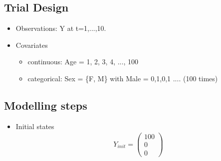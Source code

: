 \subsection*{Trial Design}

\begin{itemize}
\item
Observations: Y at t=1,...,10.
\item
Covariates
\begin{itemize}
\item
continuous: Age = 1, 2, 3, 4, ..., 100

\item
categorical: Sex = \{F, M\} with Male = 0,1,0,1 .... (100 times)
\end{itemize}
\end{itemize}



\subsection*{Modelling steps}

\begin{itemize}
\item
Initial states
\begin{align}
& Y_{init} = \left( \begin{array}{c} 100 \\ 0 \\ 0 \end{array} \right) \nonumber
\end{align}
\end{itemize}

